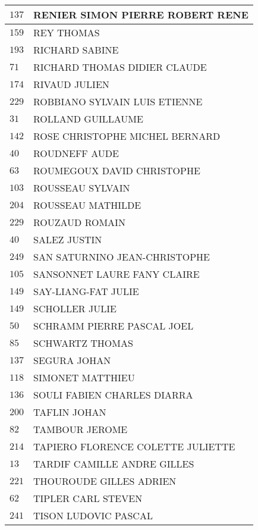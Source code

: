 \begin{xltabular}{\linewidth}{|l|X|}
    \hline
    $137$ & RENIER SIMON PIERRE ROBERT RENE \\
    \hline
    $159$ & REY THOMAS \\
    \hline
    $193$ & RICHARD SABINE \\
    \hline
    $71$ & RICHARD THOMAS DIDIER CLAUDE \\
    \hline
    $174$ & RIVAUD JULIEN \\
    \hline
    $229$ & ROBBIANO SYLVAIN LUIS ETIENNE \\
    \hline
    $31$ & ROLLAND GUILLAUME \\
    \hline
    $142$ & ROSE CHRISTOPHE MICHEL BERNARD \\
    \hline
    $40$ & ROUDNEFF AUDE \\
    \hline
    $63$ & ROUMEGOUX DAVID CHRISTOPHE \\
    \hline
    $103$ & ROUSSEAU SYLVAIN \\
    \hline
    $204$ & ROUSSEAU MATHILDE \\
    \hline
    $229$ & ROUZAUD ROMAIN \\
    \hline
    $40$ & SALEZ JUSTIN \\
    \hline
    $249$ & SAN SATURNINO JEAN-CHRISTOPHE \\
    \hline
    $105$ & SANSONNET LAURE FANY CLAIRE \\
    \hline
    $149$ & SAY-LIANG-FAT JULIE \\
    \hline
    $149$ & SCHOLLER JULIE \\
    \hline
    $50$ & SCHRAMM PIERRE PASCAL JOEL \\
    \hline
    $85$ & SCHWARTZ THOMAS \\
    \hline
    $137$ & SEGURA JOHAN \\
    \hline
    $118$ & SIMONET MATTHIEU \\
    \hline
    $136$ & SOULI FABIEN CHARLES DIARRA \\
    \hline
    $200$ & TAFLIN JOHAN \\
    \hline
    $82$ & TAMBOUR JEROME \\
    \hline
    $214$ & TAPIERO FLORENCE COLETTE JULIETTE \\
    \hline
    $13$ & TARDIF CAMILLE ANDRE GILLES \\
    \hline
    $221$ & THOUROUDE GILLES ADRIEN \\
    \hline
    $62$ & TIPLER CARL STEVEN \\
    \hline
    $241$ & TISON LUDOVIC PASCAL \\

\end{xltabular}
